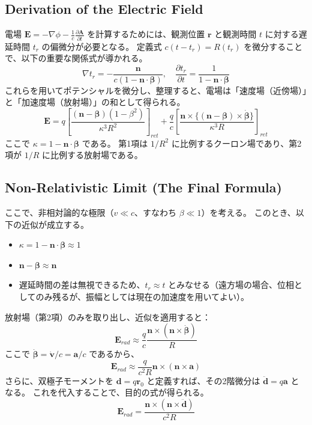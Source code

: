 \documentclass[a4paper,11pt]{bxjsarticle} %
\begin{document}
\subsection{Derivation of the Electric Field}
電場 $\mathbf{E} = -\nabla \phi - \frac{1}{c} \frac{\partial \mathbf{A}}{\partial t}$ を計算するためには、観測位置 $\mathbf{r}$ と観測時間 $t$ に対する遅延時間 $t_r$ の偏微分が必要となる。
定義式 $c(t - t_r) = R(t_r)$ を微分することで、以下の重要な関係式が導かれる。
\begin{equation}
    \nabla t_r = -\frac{\mathbf{n}}{c(1 - \mathbf{n} \cdot \boldsymbol{\beta})}, \quad \frac{\partial t_r}{\partial t} = \frac{1}{1 - \mathbf{n} \cdot \boldsymbol{\beta}}
\end{equation}
これらを用いてポテンシャルを微分し、整理すると、電場は「速度場（近傍場）」と「加速度場（放射場）」の和として得られる。
\begin{equation}
    \mathbf{E} = q \left[ \frac{(\mathbf{n} - \boldsymbol{\beta})(1 - \beta^2)}{\kappa^3 R^2} \right]_{ret} + \frac{q}{c} \left[ \frac{\mathbf{n} \times \{(\mathbf{n} - \boldsymbol{\beta}) \times \dot{\boldsymbol{\beta}}\}}{\kappa^3 R} \right]_{ret}
\end{equation}
ここで $\kappa = 1 - \mathbf{n} \cdot \boldsymbol{\beta}$ である。
第1項は $1/R^2$ に比例するクーロン場であり、第2項が $1/R$ に比例する放射場である。

\subsection{Non-Relativistic Limit (The Final Formula)}
ここで、非相対論的な極限（$v \ll c$、すなわち $\beta \ll 1$）を考える。
このとき、以下の近似が成立する。
\begin{itemize}
    \item $\kappa = 1 - \mathbf{n} \cdot \boldsymbol{\beta} \approx 1$
    \item $\mathbf{n} - \boldsymbol{\beta} \approx \mathbf{n}$
    \item 遅延時間の差は無視できるため、$t_r \approx t$ とみなせる（遠方場の場合、位相としてのみ残るが、振幅としては現在の加速度を用いてよい）。
\end{itemize}
放射場（第2項）のみを取り出し、近似を適用すると：
\begin{equation}
    \mathbf{E}_{rad} \approx \frac{q}{c} \frac{\mathbf{n} \times (\mathbf{n} \times \dot{\boldsymbol{\beta}})}{R}
\end{equation}
ここで $\dot{\boldsymbol{\beta}} = \dot{\mathbf{v}}/c = \mathbf{a}/c$ であるから、
\begin{equation}
    \mathbf{E}_{rad} \approx \frac{q}{c^2 R} \mathbf{n} \times (\mathbf{n} \times \mathbf{a})
\end{equation}
さらに、双極子モーメントを $\mathbf{d} = q \mathbf{r}_0$ と定義すれば、その2階微分は $\ddot{\mathbf{d}} = q \mathbf{a}$ となる。
これを代入することで、目的の式が得られる。
\begin{equation}
    \mathbf{E}_{rad} = \frac{\mathbf{n} \times (\mathbf{n} \times \ddot{\mathbf{d}})}{c^2 R}
\end{equation}
\end{document}
